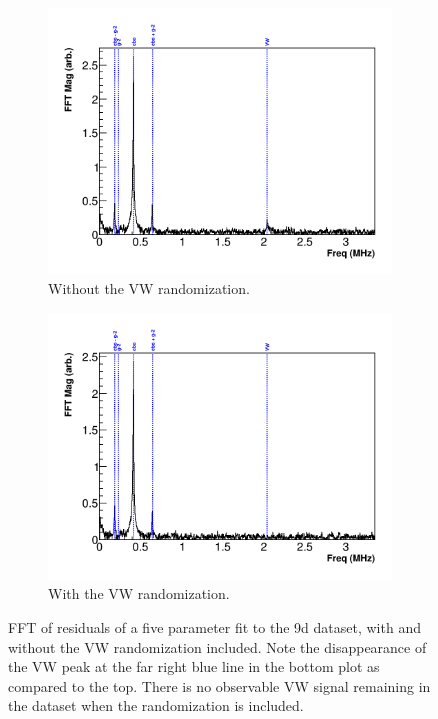 \documentclass[12pt,letterpaper]{article}
\begin{document}
\begin{figure}[]
\centering
    \begin{subfigure}[t]{0.7\textwidth}
        \centering
        \includegraphics[width=\textwidth]{FFT_fiveParameter_9d}
        \caption{Without the VW randomization.}
    \end{subfigure}%

    \begin{subfigure}[t]{0.7\textwidth}
        \centering
        \includegraphics[width=\textwidth]{FFT_fiveParameter_9d_fVWRand}
        \caption{With the VW randomization.}
    \end{subfigure}
\caption[]{FFT of residuals of a five parameter fit to the 9d dataset, with and without the VW randomization included. Note the disappearance of the VW peak at the far right blue line in the bottom plot as compared to the top. There is no observable VW signal remaining in the dataset when the randomization is included.}
\label{fig:FFT_fiveParam_fVWRand}
\end{figure}
\end{document}
